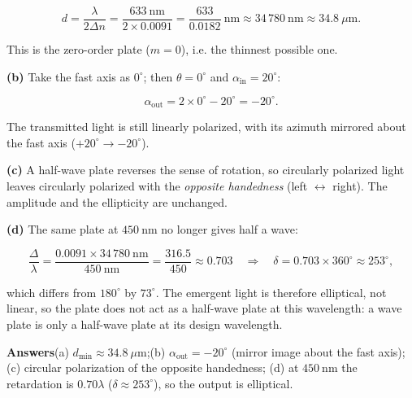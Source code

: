 \documentclass[11pt]{ctexart}
\let\subhdrtheme\subhdr
\renewcommand{\subhdr}[1]{\needspace{3\baselineskip}\subhdrtheme{#1}}
\begin{document}
\[
d=\frac{\lambda}{2\Delta n}=\frac{633\ \mathrm{nm}}{2\times0.0091}
=\frac{633}{0.0182}\ \mathrm{nm}\approx34\,780\ \mathrm{nm}\approx34.8\ \mu\mathrm{m}.
\]

This is the zero-order plate ($m=0$), i.e. the thinnest possible one.

\textbf{(b)} Take the fast axis as $0^\circ$; then $\theta=0^\circ$ and $\alpha_{\text{in}}=20^\circ$:

\[
\alpha_{\text{out}}=2\times0^\circ-20^\circ=-20^\circ .
\]

The transmitted light is still linearly polarized, with its azimuth mirrored about the fast axis
($+20^\circ\to-20^\circ$).

\textbf{(c)} A half-wave plate reverses the sense of rotation, so circularly polarized light leaves
circularly polarized with the \emph{opposite handedness} (left $\leftrightarrow$ right). The amplitude and
the ellipticity are unchanged.

\textbf{(d)} The same plate at $450\ \mathrm{nm}$ no longer gives half a wave:

\[
\frac{\Delta}{\lambda}=\frac{0.0091\times34\,780\ \mathrm{nm}}{450\ \mathrm{nm}}
=\frac{316.5}{450}\approx0.703
\quad\Longrightarrow\quad
\delta=0.703\times360^\circ\approx253^\circ ,
\]

which differs from $180^\circ$ by $73^\circ$. The emergent light is therefore elliptical, not linear, so the
plate does not act as a half-wave plate at this wavelength: a wave plate is only a half-wave plate at its
design wavelength.

\textbf{Answers}\quad (a) $d_{\min}\approx34.8\ \mu\mathrm{m}$;\quad (b) $\alpha_{\text{out}}=-20^\circ$
(mirror image about the fast axis);\quad (c) circular polarization of the opposite handedness;\quad
(d) at $450\ \mathrm{nm}$ the retardation is $0.70\lambda$ ($\delta\approx253^\circ$), so the output is
elliptical.


\end{document}
